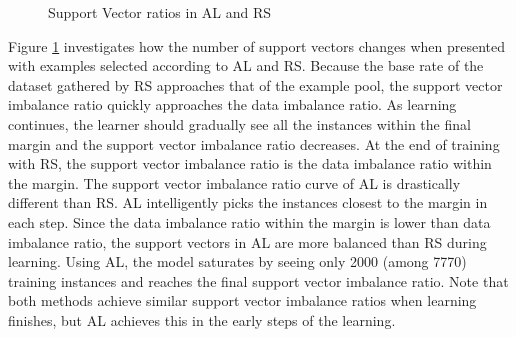 \begin{figure}[t!]
    \centering
    \caption{Support Vector ratios in AL and RS}
    \label{cruderatio}
\end{figure}

Figure \ref{cruderatio} investigates how the number of support vectors changes when presented with examples selected according to  AL and RS. Because the base rate of the dataset gathered by RS approaches that of the example pool, the support vector imbalance ratio quickly approaches the data imbalance ratio. As learning continues, the learner should gradually see all the instances within the final margin and the support vector imbalance ratio decreases. At the end of training with RS, the support vector imbalance ratio is the data imbalance ratio within the margin. The support vector imbalance ratio curve of AL is drastically different than RS. AL intelligently picks the instances closest to the margin in each step. Since the data imbalance ratio within the margin is lower than data imbalance ratio, the support vectors in AL are more balanced than RS during learning. Using AL, the model saturates by seeing only 2000 (among 7770) training instances and reaches the final support vector imbalance ratio. Note that both methods achieve similar support vector imbalance ratios when learning finishes, but AL achieves this in the early steps of the learning.

